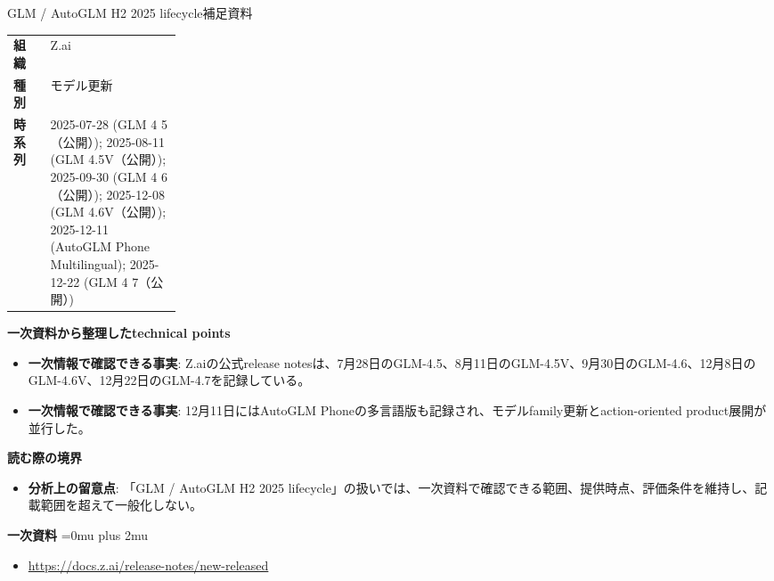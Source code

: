 \begin{technicalnote}{GLM / AutoGLM H2 2025 lifecycle}{補足資料}
\begingroup
\begin{tabularx}{\linewidth}{@{}>{\bfseries}p{0.22\linewidth}X@{}}
組織 & Z.ai \\
種別 & モデル更新 \\
時系列 & 2025-07-28 (GLM 4 5（公開）); 2025-08-11 (GLM 4.5V（公開）); 2025-09-30 (GLM 4 6（公開）); 2025-12-08 (GLM 4.6V（公開）); 2025-12-11 (AutoGLM Phone Multilingual); 2025-12-22 (GLM 4 7（公開）) \\
\end{tabularx}
\smallskip
{\bfseries 一次資料から整理したtechnical points}
\begin{itemize}[leftmargin=1.5em,itemsep=0.35em]
\item \textbf{一次情報で確認できる事実}: Z.aiの公式release notesは、7月28日のGLM-4.5、8月11日のGLM-4.5V、9月30日のGLM-4.6、12月8日のGLM-4.6V、12月22日のGLM-4.7を記録している。
\item \textbf{一次情報で確認できる事実}: 12月11日にはAutoGLM Phoneの多言語版も記録され、モデルfamily更新とaction-oriented product展開が並行した。
\end{itemize}
\begin{minipage}{\linewidth}
{\bfseries 読む際の境界}
\begin{itemize}[leftmargin=1.5em,itemsep=0.35em]
\item \textbf{分析上の留意点}: 「GLM / AutoGLM H2 2025 lifecycle」の扱いでは、一次資料で確認できる範囲、提供時点、評価条件を維持し、記載範囲を超えて一般化しない。
\end{itemize}
\begin{samepage}
{\bfseries 一次資料}
\begingroup\sloppy
\Urlmuskip=0mu plus 2mu\relax
\begin{itemize}[leftmargin=1.5em,itemsep=0.25em]
\item {\scriptsize\url{https://docs.z.ai/release-notes/new-released}}
\end{itemize}
\endgroup
\end{samepage}
\end{minipage}
\endgroup
\end{technicalnote}
\medskip
